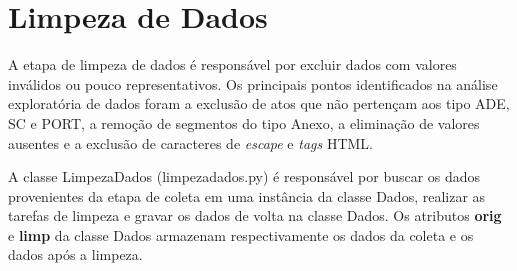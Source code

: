 \section{Limpeza de Dados}

A etapa de limpeza de dados é responsável por excluir dados com valores inválidos ou pouco representativos. Os principais pontos identificados na análise exploratória de dados foram a exclusão de atos que não pertençam aos tipo ADE, SC e PORT, a remoção de segmentos do tipo Anexo, a eliminação de valores ausentes e a exclusão de caracteres de \textit{escape} e \textit{tags} HTML.

A classe LimpezaDados (limpeza\textunderscore dados.py) é responsável por buscar os dados provenientes da etapa de coleta em uma instância da classe Dados, realizar as tarefas de limpeza e gravar os dados de volta na classe Dados. Os atributos \textbf{orig} e \textbf{limp} da classe Dados armazenam  respectivamente os dados da coleta e os dados após a limpeza.